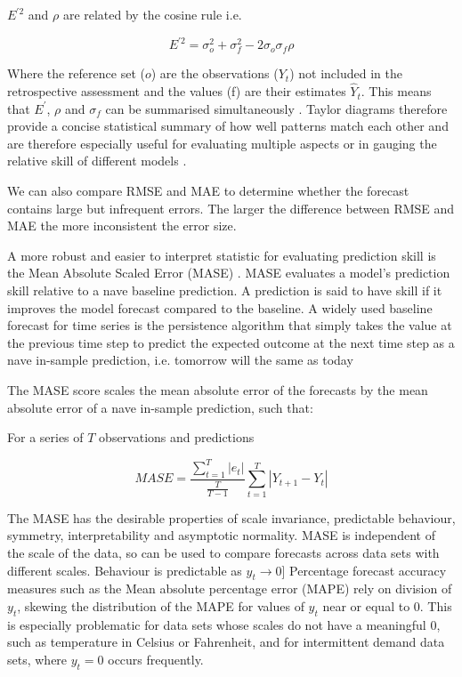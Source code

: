 $E^{\prime 2}$ and $\rho$ are related by the cosine rule i.e.


\begin{equation} {{E^{\prime 2} = \sigma_o^2 + \sigma_f^2 - 2\sigma_o\sigma_f\rho}} \end{equation}

Where the reference set ($o$) are the observations ($Y_t$) not included in the retrospective assessment and the values (f) are their estimates ${\hat{Y}_t}$. This means that $E^\prime$, $\rho$ and $\sigma_f$ can be summarised simultaneously  \citep{taylor2001summarizing}. Taylor diagrams therefore provide a concise statistical summary of how well patterns match each other and are therefore especially useful for evaluating multiple aspects or in gauging the relative skill of different models \citep{griggs2002climate}.

We can also compare RMSE and MAE to determine whether the forecast contains large but infrequent errors. The larger the difference between RMSE and MAE the more inconsistent the error size.

A more robust and easier to interpret statistic for evaluating prediction skill is the Mean Absolute Scaled Error (MASE) \citep{hyndman2006another}. MASE evaluates a model’s prediction skill relative to a nave baseline prediction. A prediction is said to have skill if it improves the model forecast compared to the baseline. A widely used baseline forecast for time series is the persistence algorithm that simply takes the value at the previous time step to predict the expected outcome at the next time step as a nave in-sample prediction, i.e. tomorrow will the same as today 

The MASE score scales the mean absolute error of the forecasts by the mean absolute error of a nave in-sample prediction, such that:

For a series of $T$ observations and predictions

\begin{equation} {MASE={\frac{\sum _{t=1}^{T}\left|e_{t}\right|}{\frac {T}{T-1}}\sum _{t=1}^{T}\left|Y_{t+1}-Y_{t}\right|}} \end{equation}

The MASE has the desirable properties of scale invariance, predictable behaviour, symmetry, interpretability and asymptotic normality. MASE is independent of the scale of the data, so can be used to compare forecasts across data sets with different scales. Behaviour is predictable as $y_{t}\rightarrow 0$] Percentage forecast accuracy measures such as the Mean absolute percentage error (MAPE) rely on division of $y_{t}$, skewing the distribution of the MAPE for values of $y_{t}$ near or equal to 0. This is especially problematic for data sets whose scales do not have a meaningful 0, such as temperature in Celsius or Fahrenheit, and for intermittent demand data sets, where $y_{t}=0$  occurs frequently.

